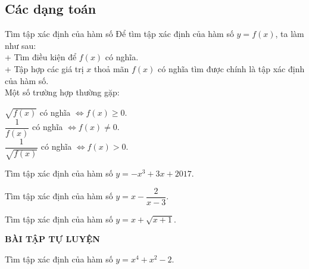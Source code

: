 \subsection{Các dạng toán}
\begin{dang}{Tìm tập xác định của hàm số}
	Để tìm tập xác định của hàm số $y=f(x)$, ta làm như sau:\\
	+ Tìm điều kiện để $f(x)$ có nghĩa.\\
	+ Tập hợp các giá trị $x$ thoả mãn $f(x)$ có nghĩa tìm được chính là tập xác định của hàm số.\\
	Một số trường hợp thường gặp:
	\begin{center}
		$\sqrt{f(x)}$ có nghĩa $\Leftrightarrow f(x)\geq 0$.\\
		$\dfrac{1}{f(x)}$ có nghĩa $\Leftrightarrow f(x)\neq 0$.\\
		$\dfrac{1}{\sqrt{f(x)}}$ có nghĩa $\Leftrightarrow f(x)> 0$.\\
	\end{center}

\end{dang}
\begin{vd}%
	Tìm tập xác định của hàm số $y=-x^3+3x+2017$.
\end{vd}

\begin{vd}%
	Tìm tập xác định của hàm số $y=x-\dfrac{2}{x-3}$.
\end{vd}
\begin{vd}%
	Tìm tập xác định của hàm số $y=x+\sqrt{x+1}$.
	\loigiai{Điều kiện $x+\sqrt{x+1}$ có nghĩa $\Leftrightarrow x+1\geq 0\Leftrightarrow x\geq -1$.\\
		Vậy tập xác định của hàm số là $\left[-1; +\infty \right)$.
	}
\end{vd}
\begin{center}
	\textbf{BÀI TẬP TỰ LUYỆN}
\end{center}
\begin{bt}%
	Tìm tập xác định của hàm số $y=x^4+x^2-2$.
\end{bt}

